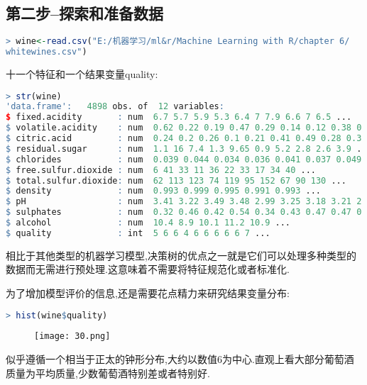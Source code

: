 \documentclass[11pt,a4paper,oneside]{book}
\begin{document}
\subsection{第二步--探索和准备数据}
\begin{lstlisting}[language=r]
> wine<-read.csv("E:/机器学习/ml&r/Machine Learning with R/chapter 6/
whitewines.csv")
\end{lstlisting}
十一个特征和一个结果变量quality:
\begin{lstlisting}[language=r]
> str(wine)
'data.frame':	4898 obs. of  12 variables:
$ fixed.acidity       : num  6.7 5.7 5.9 5.3 6.4 7 7.9 6.6 7 6.5 ...
$ volatile.acidity    : num  0.62 0.22 0.19 0.47 0.29 0.14 0.12 0.38 0.16 0.37 ...
$ citric.acid         : num  0.24 0.2 0.26 0.1 0.21 0.41 0.49 0.28 0.3 0.33 ...
$ residual.sugar      : num  1.1 16 7.4 1.3 9.65 0.9 5.2 2.8 2.6 3.9 ...
$ chlorides           : num  0.039 0.044 0.034 0.036 0.041 0.037 0.049 0.043 0.043 0.027 ...
$ free.sulfur.dioxide : num  6 41 33 11 36 22 33 17 34 40 ...
$ total.sulfur.dioxide: num  62 113 123 74 119 95 152 67 90 130 ...
$ density             : num  0.993 0.999 0.995 0.991 0.993 ...
$ pH                  : num  3.41 3.22 3.49 3.48 2.99 3.25 3.18 3.21 2.88 3.28 ...
$ sulphates           : num  0.32 0.46 0.42 0.54 0.34 0.43 0.47 0.47 0.47 0.39 ...
$ alcohol             : num  10.4 8.9 10.1 11.2 10.9 ...
$ quality             : int  5 6 6 4 6 6 6 6 6 7 ...	
\end{lstlisting}
相比于其他类型的机器学习模型,决策树的优点之一就是它们可以处理多种类型的数据而无需进行预处理.这意味着不需要将特征规范化或者标准化.

为了增加模型评价的信息,还是需要花点精力来研究结果变量分布:
\begin{lstlisting}[language=r]
> hist(wine$quality)
\end{lstlisting}
\begin{figure}[H]
	\centering
	\texttt{[image: 30.png]}
\end{figure}
似乎遵循一个相当于正太的钟形分布,大约以数值6为中心.直观上看大部分葡萄酒质量为平均质量,少数葡萄酒特别差或者特别好.
\end{document}
